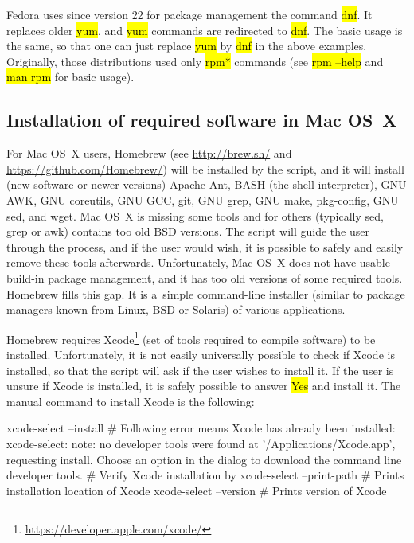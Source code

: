 \documentclass[a4paper, 11pt, twoside]{article}
\renewcommand{\texttt}[1]{\hl{\ttfamily #1}}
\begin{document}
Fedora uses since version 22 for package management the command \texttt{dnf}. It replaces older \texttt{yum}, and \texttt{yum} commands are redirected to \texttt{dnf}. The basic usage is the same, so that one can just replace \texttt{yum} by \texttt{dnf} in the above examples. Originally, those distributions used only \texttt{rpm*} commands (see \texttt{rpm --help} and \texttt{man rpm} for basic usage).

\subsection{Installation of required software in Mac OS~X}
\label{required-mac}

For Mac OS~X users, Homebrew (see \url{http://brew.sh/} and \url{https://github.com/Homebrew/}) will be installed by the script, and it will install (new software or newer versions) Apache Ant, BASH (the shell interpreter), GNU AWK, GNU coreutils, GNU GCC, git, GNU grep, GNU make, pkg-config, GNU sed, and wget. Mac OS~X is missing some tools and for others (typically sed, grep or awk) contains too old BSD versions. The script will guide the user through the process, and if the user would wish, it is possible to safely and easily remove these tools afterwards. Unfortunately, Mac OS~X does not have usable build-in package management, and it has too old versions of some required tools. Homebrew fills this gap. It is a~simple command-line installer (similar to package managers known from Linux, BSD or Solaris) of various applications.

Homebrew requires Xcode\footnote{\url{https://developer.apple.com/xcode/}} (set of tools required to compile software) to be installed. Unfortunately, it is not easily universally possible to check if Xcode is installed, so that the script will ask if the user wishes to install it. If the user is unsure if Xcode is installed, it is safely possible to answer \texttt{Yes} and install it. The manual command to install Xcode is the following:

\begin{bashcode}
  xcode-select --install
  # Following error means Xcode has already been installed:
  xcode-select: note: no developer tools were found at '/Applications/Xcode.app',
    requesting install. Choose an option in the dialog to download the command
    line developer tools.
  # Verify Xcode installation by
  xcode-select --print-path # Prints installation location of Xcode
  xcode-select --version # Prints version of Xcode
\end{bashcode}
\end{document}
